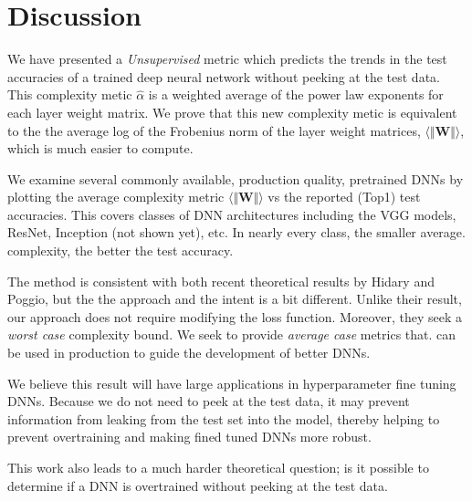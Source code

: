 \vspace{-4mm}
\section{Discussion}
\label{sxn:discussion}
\vspace{-3mm}

We have presented a \emph{Unsupervised} metric which  predicts the trends in the test accuracies of a trained deep neural network without peeking at the test data. This complexity metic $\hat{\alpha}$ is a weighted average of the power law exponents for each layer weight matrix. We prove that this new complexity metic  is equivalent to the the average log of the Frobenius norm of the layer weight matrices, $\langle\Vert\mathbf{W}\Vert\rangle$, which is much easier to compute.

We examine several  commonly available, production quality, pretrained DNNs  by plotting  the average complexity metric $\langle\Vert\mathbf{W}\Vert\rangle$ vs the reported (Top1) test accuracies. This covers classes of DNN architectures including the VGG models, ResNet, Inception (not shown yet), etc.  In nearly every class, the smaller average. complexity, the better the test accuracy.

The method is consistent with both recent theoretical results by Hidary and Poggio, but the the approach and the intent is a bit different. 
Unlike their result, our approach does not require modifying the loss function.
Moreover, they seek a \emph{worst case} complexity bound.  We seek to provide \emph{average case} metrics that. can be used in production
to guide the development of better DNNs.

We believe this result will have large applications in hyperparameter fine tuning DNNs.  Because we do not need to peek at the test data, it may prevent information from leaking from the test set into the model, thereby helping to prevent overtraining and making fined tuned DNNs more robust.

This work also leads to a much harder theoretical question; is it possible to determine if a DNN is overtrained without peeking at the test data.